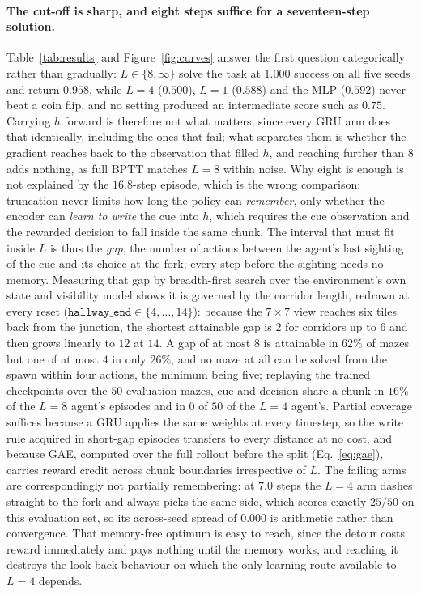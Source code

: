 \documentclass{article}
\begin{document}
\paragraph{The cut-off is sharp, and eight steps suffice for a seventeen-step
solution.} Table~\ref{tab:results} and Figure~\ref{fig:curves} answer the first
question categorically rather than gradually: $L \in \{8, \infty\}$ solve the
task at $1.000$ success on all five seeds and return $0.958$, while $L=4$
($0.500$), $L=1$ ($0.588$) and the MLP ($0.592$) never beat a coin flip, and no
setting produced an intermediate score such as $0.75$. Carrying $h$ forward is
therefore not what matters, since every GRU arm does that identically, including
the ones that fail; what separates them is whether the gradient reaches back to
the observation that filled $h$, and reaching further than $8$ adds nothing, as
full BPTT matches $L=8$ within noise. Why eight is enough is not explained by
the $16.8$-step episode, which is the wrong comparison: truncation never limits
how long the policy can \emph{remember}, only whether the encoder can
\emph{learn to write} the cue into $h$, which requires the cue observation and
the rewarded decision to fall inside the same chunk. The interval that must fit
inside $L$ is thus the \emph{gap}, the number of actions between the agent's
last sighting of the cue and its choice at the fork; every step before the
sighting needs no memory. Measuring that gap by breadth-first search over the
environment's own state and visibility model shows it is governed by the
corridor length, redrawn at every reset
($\texttt{hallway\_end} \in \{4,\dots,14\}$): because the $7 \times 7$ view
reaches six tiles back from the junction, the shortest attainable gap is $2$ for
corridors up to $6$ and then grows linearly to $12$ at $14$. A gap of at most
$8$ is attainable in $62\%$ of mazes but one of at most $4$ in only $26\%$, and
no maze at all can be solved from the spawn within four actions, the minimum
being five; replaying the trained checkpoints over the $50$ evaluation mazes,
cue and decision share a chunk in $16\%$ of the $L=8$ agent's episodes and in
$0$ of $50$ of the $L=4$ agent's. Partial coverage suffices because a GRU
applies the same weights at every timestep, so the write rule acquired in
short-gap episodes transfers to every distance at no cost, and because GAE,
computed over the full rollout before the split (Eq.~\ref{eq:gae}), carries
reward credit across chunk boundaries irrespective of $L$. The failing arms are
correspondingly not partially remembering: at $7.0$ steps the $L=4$ arm dashes
straight to the fork and always picks the same side, which scores exactly
$25/50$ on this evaluation set, so its across-seed spread of $0.000$ is
arithmetic rather than convergence. That memory-free optimum is easy to reach,
since the detour costs reward immediately and pays nothing until the memory
works, and reaching it destroys the look-back behaviour on which the only
learning route available to $L=4$ depends.
\end{document}
